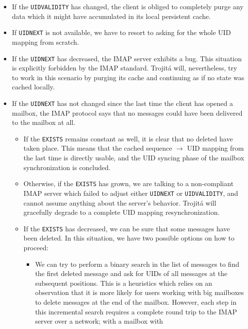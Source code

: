 \documentclass[trojita]{subfiles}
\begin{document}
{\begin{itemize}
    \item If the {\tt UIDVALIDITY} has changed, the client is obliged to completely purge any data which it might have
        accumulated in its local persistent cache.
    \item If {\tt UIDNEXT} is not available, we have to resort to asking for the whole UID mapping from scratch.
    \item If the {\tt UIDNEXT} has decreased, the IMAP server exhibits a bug.  This situation is explicitly forbidden by
        the IMAP standard.  Trojitá will, nevertheless, try to work in this scenario by purging its cache and continuing
        as if no state was cached locally.
    \item If the {\tt UIDNEXT} has not changed since the last time the client has opened a mailbox, the IMAP protocol
        says that no messages could have been delivered to the mailbox at all.
        \begin{itemize}
            \item If the {\tt EXISTS} remains constant as well, it is clear that no deleted have taken place. This means
                that the cached sequence $\rightarrow$ UID mapping from the last time is directly usable, and the UID
                syncing phase of the mailbox synchronization is concluded.
            \item Otherwise, if the {\tt EXISTS} has grown, we are talking to a non-compliant IMAP server which failed
                to adjust either {\tt UIDNEXT} or {\tt UIDVALIDITY}, and cannot assume anything about the server's
                behavior.  Trojitá will gracefully degrade to a complete UID mapping resynchronization.
            \item If the {\tt EXISTS} has decreased, we can be sure that some messages have been deleted.  In this
                situation, we have two possible options on how to proceed:
                \begin{itemize}
                    \item We can try to perform a binary search in the list of messages to find the first deleted
                        message and ask for UIDs of all messages at the subsequent positions.  This is a heuristics
                        which relies on an observation that it is more likely for users working with big mailboxes to
                        delete messages at the end of the mailbox.  However, each step in this incremental search
                        requires a complete round trip to the IMAP server over a network; with a mailbox with

\end{itemize}
\end{itemize}
\end{itemize}}
\end{document}
